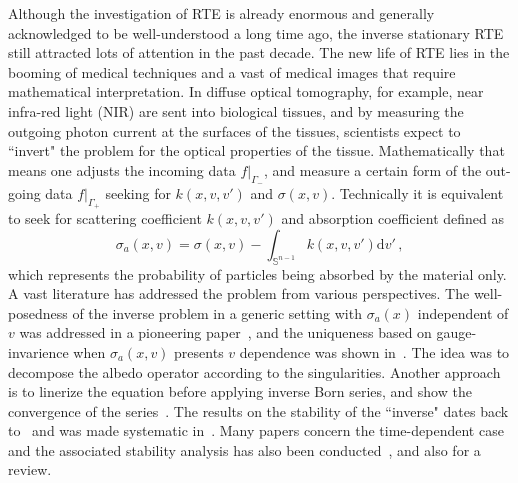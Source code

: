 \documentclass[english,reqno]{amsart}
\theoremstyle{plain}
\theoremstyle{definition} %
\newcommand{\rd}{\mathrm{d}}
\begin{document}
Although the investigation of RTE is already enormous and generally acknowledged to be well-understood a long time ago, the inverse stationary RTE still attracted lots of attention in the past decade. The new life of RTE lies in the booming of medical techniques and a vast of medical images that require mathematical interpretation. In diffuse optical tomography, for example, near infra-red light (NIR) are sent into biological tissues, and by measuring the outgoing photon current at the surfaces of the tissues, scientists expect to ``invert" the problem for the optical properties of the tissue. Mathematically that means one adjusts the incoming data $f|_{\Gamma_-}$, and measure a certain form of the out-going data $f|_{\Gamma_+}$ seeking for $k(x,v,v')$ and $\sigma(x,v)$. Technically it is equivalent to seek for scattering coefficient $k(x,v,v')$ and absorption coefficient defined as 
\begin{equation}
\sigma_a(x,v)=\sigma(x,v)-\int_{\mathbb{S}^{n-1}}k(x,v,v')\rd{v'} \,,
\end{equation}
which represents the probability of particles being absorbed by the material only. A vast literature has addressed the problem from various perspectives. The well-posedness of the inverse problem in a generic setting with $\sigma_a(x)$ independent of $v$ was addressed in a pioneering paper~\cite{ChoulliStefenov}, and the uniqueness based on gauge-invarience when $\sigma_a(x,v)$ presents $v$ dependence was shown in~\cite{Stefenov2}. The idea was to decompose the albedo operator according to the singularities. Another approach is to linerize the equation before applying inverse Born series, and show the convergence of the series~\cite{Machida_Schotland_inverse}. The results on the stability of the ``inverse" dates back to~\cite{Wang} and was made systematic in~\cite{Bal09, Bal10a, Bal08}. Many papers concern the time-dependent case and the associated stability analysis has also been conducted~\cite{Larsen88, Romanov96, CS96}, and also \cite{Bal_review} for a review.
\end{document}
